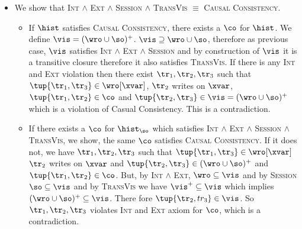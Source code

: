\begin{itemize}
\begin{itemize}
              
       \end{itemize}
 \item We show that \textsc{Int} $\land$ \textsc{Ext} $\land$ \textsc{Session} $\land$ \textsc{TransVis} $\equiv$ \textsc{Causal Consistency}.
       \begin{itemize}
        \item If $\hist$ satisfies \textsc{Causal Consistency}, there exists a $\co$ for $\hist$. We define $\vis = (\wro \cup \so)^+$.
              $\vis \supseteq \wro \cup \so$, therefore as previous case, $\vis$ satisfies \textsc{Int} $\land$ \textsc{Ext} $\land$ \textsc{Session} and by construction of $\vis$ it is a transitive closure therefore it also satisfies \textsc{TransVis}. If there is any \textsc{Int} and \textsc{Ext} violation then there exist $\tr_1, \tr_2, \tr_3$ such that $\tup{\tr_1, \tr_3} \in \wro[\xvar]$, $\tr_2$ writes on $\xvar$, $\tup{\tr_1, \tr_2} \in \co$ and $\tup{\tr_2, \tr_3} \in \vis = (\wro \cup \so)^+$ which is a violation of \textsf{Casual Consistency}. This is a contradiction. 
              
        \item If there exists a $\co$ for $\hist_{\so}$ which satisfies \textsc{Int} $\land$ \textsc{Ext} $\land$ \textsc{Session} $\land$ \textsc{TransVis}, we show, the same $\co$ satisfies \textsc{Causal Consistency}. If it does not, we have $\tr_1, \tr_2, \tr_3$ such that $\tup{\tr_1, \tr_3} \in \wro[\xvar]$ $\tr_2$ writes on $\xvar$ and $\tup{\tr_2, \tr_3} \in (\wro \cup \so)^+$ and $\tup{\tr_1, \tr_2} \in \co$. But, by \textsc{Int} $\land$ \textsc{Ext}, $\wro \subseteq \vis$ and by \textsc{Session} $\so \subseteq \vis$ and by \textsc{TransVis} we have $\vis^+ \subseteq \vis$ which implies $(\wro \cup \so)^+ \subseteq \vis$. There fore $\tup{\tr_2,tr_3} \in \vis$. So $\tr_1, \tr_2, \tr_3$ violates \textsc{Int} and \textsc{Ext} axiom for $\co$, which is a contradiction.
       \end{itemize}
       

\end{itemize}
